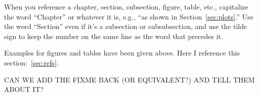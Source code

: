When you reference a chapter, section, subsection, figure, table, etc., capitalize the word ``Chapter'' or whatever it is, e.g., ``as shown in Section~\ref{sec:plots}.''  Use the word ``Section'' even if it's a subsection or subsubsection, and use the tilde sign to keep the number on the same line as the word that precedes it.

Examples for figures and tables have been given above.  Here I
reference this section:~\ref{sec:refs}.  


CAN WE ADD THE FIXME BACK (OR EQUIVALENT?) AND TELL THEM ABOUT IT?
